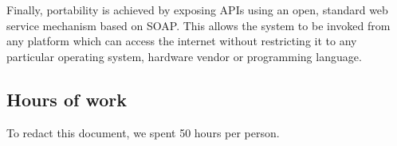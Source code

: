 Finally, portability is achieved by exposing APIs using an open, standard web service mechanism based on SOAP. This allows the system to be invoked from any platform which can access the internet without restricting it to any particular operating system, hardware vendor or programming language. 

\begin{appendices}

\chapter{Hours of work}
To redact this document, we spent 50 hours per person.

\end{appendices}